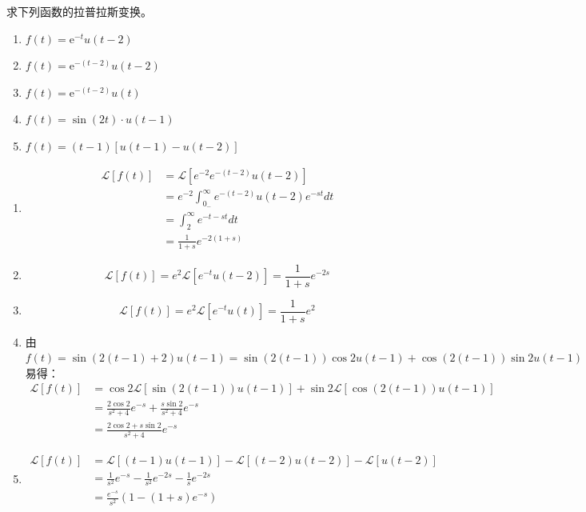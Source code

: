\documentclass[answers]{exam}  %
\begin{document}
\begin{questions}
\question 求下列函数的拉普拉斯变换。
\begin{enumerate}[(1)]
\item $f(t)=\mathrm{e}^{-t}u(t-2)$
\item $f(t)=\mathrm{e}^{-(t-2)}u(t-2)$
\item $f(t)=\mathrm{e}^{-(t-2)}u(t)$
\item $f(t)=\sin(2t)\cdot u(t-1)$
\item $f(t)=(t-1)[u(t-1)-u(t-2)]$
\end{enumerate}
\begin{solution}
\begin{enumerate}[(1)]
	\item \begin{align*}
		\mathcal{L}[f(t)]&=\mathcal{L}[e^{-2}e^{-(t-2)}u(t-2)]\\
		&=e^{-2}\int_{0_-}^{\infty}e^{-(t-2)}u(t-2)e^{-st}dt\\
		&=\int_{2}^{\infty}e^{-t-st}dt\\
		&=\frac{1}{1+s}e^{-2(1+s)}
	\end{align*}
    \item $$\mathcal{L}[f(t)]=e^2\mathcal{L}[e^{-t}u(t-2)]=\frac{1}{1+s}e^{-2s}$$
    \item $$\mathcal{L}[f(t)]=e^2\mathcal{L}[e^{-t}u(t)]=\frac{1}{1+s}e^{2}$$
    \item 由$f(t)=\sin(2(t-1)+2)u(t-1)=\sin(2(t-1))\cos2u(t-1)+\cos(2(t-1))\sin2u(t-1)$易得：\begin{align*}
    	\mathcal{L}[f(t)]&=\cos2\mathcal{L}[\sin(2(t-1))u(t-1)]+\sin2\mathcal{L}[\cos(2(t-1))u(t-1)]\\
    	&=\frac{2\cos2}{s^2+4}e^{-s}+\frac{s\sin2}{s^2+4}e^{-s}\\
    	&=\frac{2\cos2+s\sin2}{s^2+4}e^{-s}
    \end{align*}
    \item \begin{align*}
    	\mathcal{L}[f(t)]&=\mathcal{L}[(t-1)u(t-1)]-\mathcal{L}[(t-2)u(t-2)]-\mathcal{L}[u(t-2)]\\&=\frac{1}{s^2}e^{-s}-\frac{1}{s^2}e^{-2s}-\frac{1}{s}e^{-2s}\\
    	&=\frac{e^{-s}}{s^2}(1-(1+s)e^{-s})
    \end{align*}
\end{enumerate}
\end{solution}


\end{questions}
\end{document}
